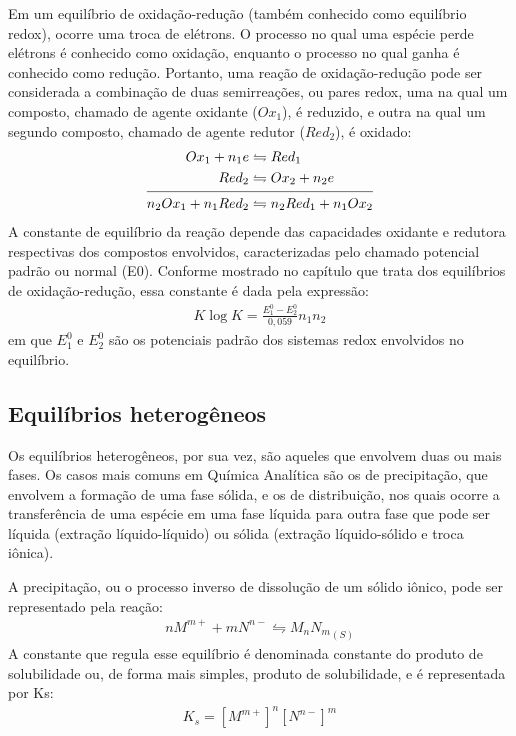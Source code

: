 \begin{definition}
    Em um equilíbrio de oxidação-redução (também conhecido como equilíbrio redox), ocorre uma troca de elétrons. O processo no qual uma espécie perde elétrons é conhecido como oxidação, enquanto o processo no qual ganha é conhecido como redução. Portanto, uma reação de oxidação-redução pode ser considerada a combinação de duas semirreações, ou pares redox, uma na qual um composto, chamado de agente oxidante ($Ox_1$), é reduzido, e outra na qual um segundo composto, chamado de agente redutor ($Red_2$), é oxidado:
    \begin{gather}
        \begin{split}
            Ox_1 + n_1 e &\leftrightharpoons Red_1 \\
            Red_2 &\leftrightharpoons Ox_2 + n_2 e \\
            \noalign{\smallskip} \hline \noalign{\smallskip}
            n_2 Ox_1 + n_1 Red_2 &\leftrightharpoons n_2 Red_1 + n_1 Ox_2
        \end{split}
    \end{gather}
    A constante de equilíbrio da reação depende das capacidades oxidante e redutora respectivas dos compostos envolvidos, caracterizadas pelo chamado potencial padrão ou normal (E0). Conforme mostrado no capítulo que trata dos equilíbrios de oxidação-redução, essa constante é dada pela expressão:
    \begin{gather}
        K \log K = \frac{E_1^0 - E_2^0}{0,059} n_1 n_2
    \end{gather}
    em que $E_1^0$ e $E_2^0$ são os potenciais padrão dos sistemas redox envolvidos no equilíbrio.
\end{definition}

\subsection*{Equilíbrios heterogêneos}

Os equilíbrios heterogêneos, por sua vez, são aqueles que envolvem duas ou mais fases. Os casos mais comuns em Química Analítica são os de precipitação, que envolvem a formação de uma fase sólida, e os de distribuição, nos quais ocorre a transferência de uma espécie em uma fase líquida para outra fase que pode ser líquida (extração líquido-líquido) ou sólida (extração líquido-sólido e troca iônica).

\begin{definition}
    A precipitação, ou o processo inverso de dissolução de um sólido iônico, pode ser representado pela reação:
    \begin{gather}
        n M^{m+} + m N^{n-} \leftrightharpoons {M_n N_m}_{(S)}
    \end{gather}
    A constante que regula esse equilíbrio é denominada constante do produto de solubilidade ou, de forma mais simples, produto de solubilidade, e é representada por Ks:
    \begin{gather}
        K_s = [M^{m+}]^n [N^{n-}]^m
    \end{gather}
\end{definition}

